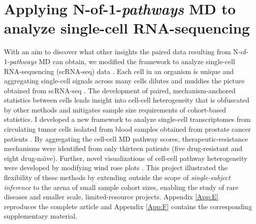 \chapter{Applying N-of-1-\emph{pathways} MD to\\analyze single-cell RNA-sequencing} \label{Chap:ctcs}

\indent \indent With an aim to discover what other insights the paired data resulting from N-of-1-\emph{pathways} MD can obtain, we modified the framework to analyze single-cell RNA-sequencing (scRNA-seq) data \citep{Tang2009}. Each cell in an organism is unique and aggregating single-cell signals across many cells dilutes and muddies the picture obtained from scRNA-seq \citep{Schubert2011}. The development of paired, mechanism-anchored statistics between cells lends insight into cell-cell heterogeneity that is obfuscated by other methods and mitigates sample size requirements of cohort-based statistics. I developed a new framework to analyze single-cell transcriptomes from circulating tumor cells isolated from blood samples obtained from prostate cancer patients \citep{Patel2014,Schissler2016}. By aggregating the cell-cell MD pathway scores, therapeutic-resistance mechanisms were identified from only thirteen patients (five drug-resistant and eight drug-na\"{\i}ve). Further, novel visualizations of cell-cell pathway heterogeneity were developed by modifying wind rose plots \citep{Court1963}. This project illustrated the flexibility of these methods by extending outside the scope of \emph{single-subject inference} to the arena of small sample cohort sizes, enabling the study of rare diseases and smaller scale, limited-resource projects. Appendix \ref{App:E} reproduces the complete \citet{Schissler2016} article and Appendix \ref{App:F} contains the corresponding supplementary material.
%
